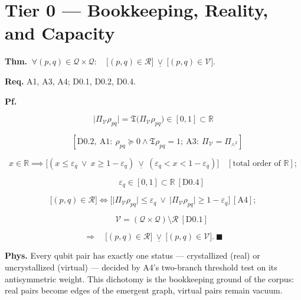 \section[Tier 0 — Bookkeeping, Reality, and Capacity]{\texorpdfstring{Tier 0 — Bookkeeping, Reality, and Capacity}{Tier 0 - Bookkeeping, Reality, and Capacity}}

\begin{theorem}\label{tag:CT0-1}
\textbf{Thm.} $\ \forall(p,q)\in\mathcal Q\times\mathcal Q:\quad\bigl[(p,q)\in\mathcal R\bigr]\ \underline\vee\ \bigl[(p,q)\in\mathcal V\bigr].$

\textbf{Req.} A1, A3, A4; D0.1, D0.2, D0.4.

\textbf{Pf.}

\[
\bigl|\Pi_{\mathcal V}\rho_{pq}\bigr|=\mathfrak T\bigl(\Pi_{\mathcal V}\rho_{pq}\bigr)\in[0,1]\subset\mathbb R
\]

\[
\quad [\mathrm{D0.2},\ \mathrm{A1}:\ \rho_{pq}\succeq0\wedge\mathfrak T\rho_{pq}=1;\ \mathrm{A3}:\ \Pi_{\mathcal V}=\Pi_{\wedge^2}]
\]

\[
x\in\mathbb R\implies\bigl[(x\le\varepsilon_q\ \vee\ x\ge1-\varepsilon_q)\ \underline\vee\ (\varepsilon_q<x<1-\varepsilon_q)\bigr]\quad[\text{total order of }\mathbb R];
\]

\[
\qquad \varepsilon_q\in[0,1]\subset\mathbb R\ [\mathrm{D0.4}]
\]

\[
\bigl[(p,q)\in\mathcal R\bigr]\iff\bigl[\bigl|\Pi_{\mathcal V}\rho_{pq}\bigr|\le\varepsilon_q\ \vee\ \bigl|\Pi_{\mathcal V}\rho_{pq}\bigr|\ge1-\varepsilon_q\bigr]\ [\mathrm{A4}];
\]

\[
\qquad \mathcal V=(\mathcal Q\times\mathcal Q)\setminus\mathcal R\ [\mathrm{D0.1}]
\]

\[
\Longrightarrow\quad\bigl[(p,q)\in\mathcal R\bigr]\ \underline\vee\ \bigl[(p,q)\in\mathcal V\bigr].\ \blacksquare
\]

\textbf{Phys.} Every qubit pair has exactly one status — crystallized (real) or uncrystallized (virtual) — decided by A4's two-branch threshold test on its antisymmetric weight. This dichotomy is the bookkeeping ground of the corpus: real pairs become edges of the emergent graph, virtual pairs remain vacuum.

\end{theorem}

